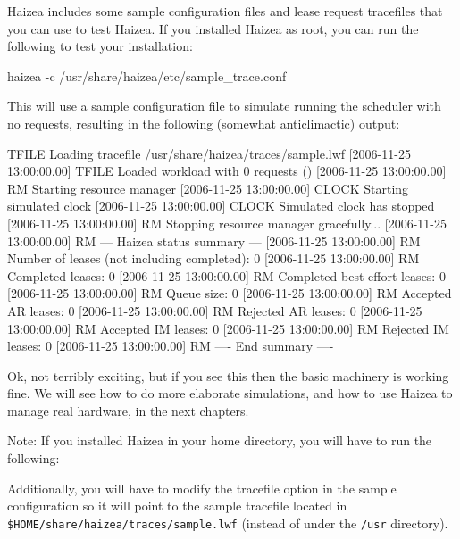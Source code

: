 Haizea includes some sample configuration files and lease request tracefiles that you can use to test Haizea. If you installed Haizea as root, you can run the following to test your installation:

\begin{shellverbatim}
haizea -c /usr/share/haizea/etc/sample_trace.conf
\end{shellverbatim}

This will use a sample configuration file to simulate running the scheduler with no requests, resulting in the following (somewhat anticlimactic) output:

\begin{wideshellverbatim}
[2006-11-25 13:00:00.00] TFILE   Loading tracefile /usr/share/haizea/traces/sample.lwf
[2006-11-25 13:00:00.00] TFILE   Loaded workload with 0 requests ()
[2006-11-25 13:00:00.00] RM      Starting resource manager
[2006-11-25 13:00:00.00] CLOCK   Starting simulated clock
[2006-11-25 13:00:00.00] CLOCK   Simulated clock has stopped
[2006-11-25 13:00:00.00] RM      Stopping resource manager gracefully...
[2006-11-25 13:00:00.00] RM      --- Haizea status summary ---
[2006-11-25 13:00:00.00] RM      Number of leases (not including completed): 0
[2006-11-25 13:00:00.00] RM      Completed leases: 0
[2006-11-25 13:00:00.00] RM      Completed best-effort leases: 0
[2006-11-25 13:00:00.00] RM      Queue size: 0
[2006-11-25 13:00:00.00] RM      Accepted AR leases: 0
[2006-11-25 13:00:00.00] RM      Rejected AR leases: 0
[2006-11-25 13:00:00.00] RM      Accepted IM leases: 0
[2006-11-25 13:00:00.00] RM      Rejected IM leases: 0
[2006-11-25 13:00:00.00] RM      ---- End summary ----
\end{wideshellverbatim}

Ok, not terribly exciting, but if you see this then the basic machinery is working fine. We will see how to do more elaborate simulations, and how to use Haizea to manage real hardware, in the next chapters.

Note: If you installed Haizea in your home directory, you will have to run the following:


Additionally, you will have to modify the tracefile option in the sample configuration so it will point to the sample tracefile located in \texttt{\$HOME/share/haizea/traces/sample.lwf} (instead of under the \texttt{/usr} directory).